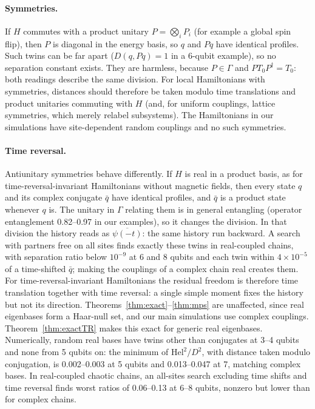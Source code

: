 \documentclass[11pt]{article}
\theoremstyle{definition}
\theoremstyle{remark}
\newcommand{\Hel}{\mathrm{Hel}}
\begin{document}
\paragraph{Symmetries.} If $H$ commutes with a product unitary $P=\bigotimes_iP_i$ (for example a global spin flip), then $P$ is diagonal in the energy basis, so $q$ and $Pq$ have identical profiles. Such twins can be far apart ($D(q,Pq)=1$ in a 6-qubit example), so no separation constant exists. They are harmless, because $P\in\Gamma$ and $PT_0P^\dagger=T_0$: both readings describe the same division. For local Hamiltonians with symmetries, distances should therefore be taken modulo time translations and product unitaries commuting with $H$ (and, for uniform couplings, lattice symmetries, which merely relabel subsystems). The Hamiltonians in our simulations have site-dependent random couplings and no such symmetries.

\paragraph{Time reversal.} Antiunitary symmetries behave differently. If $H$ is real in a product basis, as for time-reversal-invariant Hamiltonians without magnetic fields, then every state $q$ and its complex conjugate $\bar q$ have identical profiles, and $\bar q$ is a product state whenever $q$ is. The unitary in $\Gamma$ relating them is in general entangling (operator entanglement 0.82--0.97 in our examples), so it changes the division. In that division the history reads as $\overline{\psi(-t)}$: the same history run backward. A search with partners free on all sites finds exactly these twins in real-coupled chains, with separation ratio below $10^{-9}$ at 6 and 8 qubits and each twin within $4\times10^{-5}$ of a time-shifted $\bar q$; making the couplings of a complex chain real creates them. For time-reversal-invariant Hamiltonians the residual freedom is therefore time translation together with time reversal: a single simple moment fixes the history but not its direction. Theorems~\ref{thm:exact}--\ref{thm:mps} are unaffected, since real eigenbases form a Haar-null set, and our main simulations use complex couplings. Theorem~\ref{thm:exactTR} makes this exact for generic real eigenbases. Numerically, random real bases have twins other than conjugates at 3--4 qubits and none from 5 qubits on: the minimum of $\Hel^2/D^2$, with distance taken modulo conjugation, is 0.002--0.003 at 5 qubits and 0.013--0.047 at 7, matching complex bases. In real-coupled chaotic chains, an all-sites search excluding time shifts and time reversal finds worst ratios of 0.06--0.13 at 6--8 qubits, nonzero but lower than for complex chains.
\end{document}
